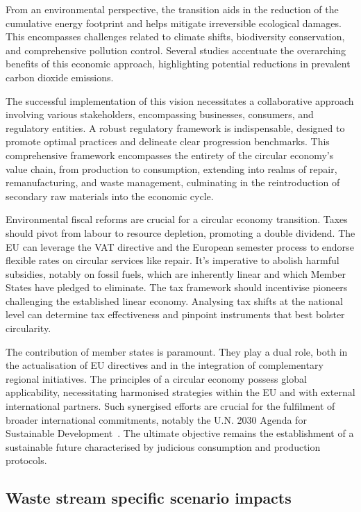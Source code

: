 From an environmental perspective, the transition aids in the reduction of the cumulative energy footprint and helps mitigate irreversible ecological damages. This encompasses challenges related to climate shifts, biodiversity conservation, and comprehensive pollution control. Several studies accentuate the overarching benefits of this economic approach, highlighting potential reductions in prevalent carbon dioxide emissions.

The successful implementation of this vision necessitates a collaborative approach involving various stakeholders, encompassing businesses, consumers, and regulatory entities. A robust regulatory framework is indispensable, designed to promote optimal practices and delineate clear progression benchmarks. This comprehensive framework encompasses the entirety of the circular economy's value chain, from production to consumption, extending into realms of repair, remanufacturing, and waste management, culminating in the reintroduction of secondary raw materials into the economic cycle.

Environmental fiscal reforms are crucial for a circular economy transition. Taxes should pivot from labour to resource depletion, promoting a double dividend. The EU can leverage the VAT directive and the European semester process to endorse flexible rates on circular services like repair. It's imperative to abolish harmful subsidies, notably on fossil fuels, which are inherently linear and which Member States have pledged to eliminate. The tax framework should incentivise pioneers challenging the established linear economy. Analysing tax shifts at the national level can determine tax effectiveness and pinpoint instruments that best bolster circularity.

The contribution of member states is paramount. They play a dual role, both in the actualisation of EU directives and in the integration of complementary regional initiatives. The principles of a circular economy possess global applicability, necessitating harmonised strategies within the EU and with external international partners. Such synergised efforts are crucial for the fulfilment of broader international commitments, notably the U.N. 2030 Agenda for Sustainable Development~\cite{un2015sdg}. The ultimate objective remains the establishment of a sustainable future characterised by judicious consumption and production protocols.

\subsectionEndline
\clearpage

\subsection{Waste stream specific scenario impacts}


